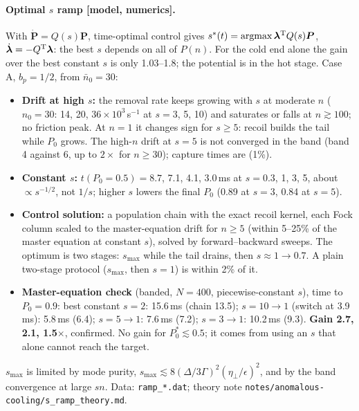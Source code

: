 \documentclass[11pt,a4paper]{article}
\newcommand{\etaeff}{\eta_{\perp}}
\begin{document}
\paragraph{Optimal $s$ ramp [model, numerics].} With $\dot{\bm P}=Q(s)\bm P$, time-optimal control gives $s^*(t)={\rm argmax}\,\bm\lambda^{\rm T}Q(s)\bm P$, $\dot{\bm\lambda}=-Q^{\rm T}\bm\lambda$: the best $s$ depends on all of $P(n)$. For the cold end alone the gain over the best constant $s$ is only 1.03--1.8; the potential is in the hot stage. Case A, $b_p=1/2$, from $\bar n_0=30$:
\begin{itemize}
\item \textbf{Drift at high $s$:} the removal rate keeps growing with $s$ at moderate $n$ ($n_0=30$: 14, 20, $36\times10^3\,$s$^{-1}$ at $s=3$, 5, 10) and saturates or falls at $n\gtrsim100$; no friction peak. At $n=1$ it changes sign for $s\ge5$: recoil builds the tail while $P_0$ grows. The high-$n$ drift at $s=5$ is not converged in the band (band 4 against 6, up to $2\times$ for $n\ge30$); capture times are (1\%).
\item \textbf{Constant $s$:} $t(P_0=0.5)=8.7$, 7.1, 4.1, 3.0\,ms at $s=0.3$, 1, 3, 5, about $\propto s^{-1/2}$, not $1/s$; higher $s$ lowers the final $P_0$ (0.89 at $s=3$, 0.84 at $s=5$).
\item \textbf{Control solution:} a population chain with the exact recoil kernel, each Fock column scaled to the master-equation drift for $n\ge5$ (within 5--25\% of the master equation at constant $s$), solved by forward--backward sweeps. The optimum is two stages: $s_{\max}$ while the tail drains, then $s\approx1\to0.7$. A plain two-stage protocol ($s_{\max}$, then $s=1$) is within 2\% of it.
\item \textbf{Master-equation check} (banded, $N=400$, piecewise-constant $s$), time to $P_0=0.9$: best constant $s=2$: 15.6\,ms (chain 13.5); $s=10\to1$ (switch at 3.9\,ms): 5.8\,ms (6.4); $s=5\to1$: 7.6\,ms (7.2); $s=3\to1$: 10.2\,ms (9.3). \textbf{Gain 2.7, 2.1, 1.5$\times$}, confirmed. No gain for $P_0^*\lesssim0.5$; it comes from using an $s$ that alone cannot reach the target.
\end{itemize}
$s_{\max}$ is limited by mode purity, $s_{\max}\lesssim8(\Delta/3\Gamma)^2(\etaeff/\epsilon)^2$, and by the band convergence at large $sn$. Data: \texttt{ramp\_*.dat}; theory note \texttt{notes/anomalous-cooling/s\_ramp\_theory.md}.
\end{document}
